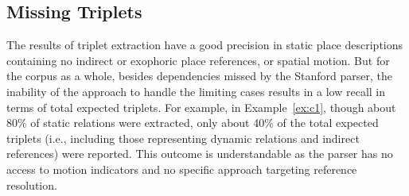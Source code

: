 \documentclass{acm_proc_article-sp}
\begin{document}
\subsection{Missing Triplets}
\label{missing}
The results of triplet extraction have a good precision in static place descriptions containing no indirect or exophoric place references, or spatial motion. But for the corpus as a whole, besides dependencies missed by the Stanford parser, the inability of the approach to handle the limiting cases results in a low recall in terms of total expected triplets. For example, in Example~\ref{ex:c1}, though about 80\% of static relations were extracted, only about 40\% of the total expected triplets (i.e., including those representing dynamic relations and indirect references) were reported. This outcome is understandable as the parser has no access to motion indicators and no specific approach targeting reference resolution.
\end{document}
